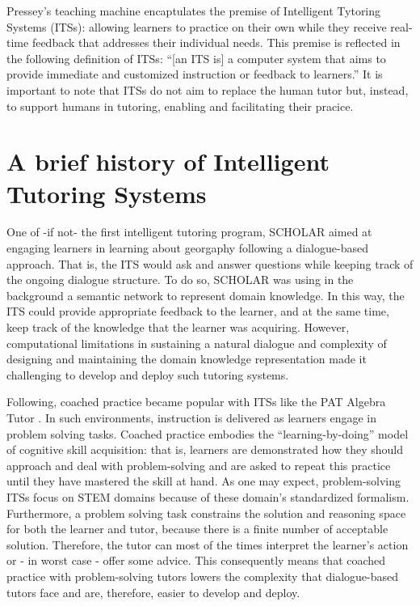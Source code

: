 \documentclass[
]{book}
\begin{document}
Pressey's teaching machine encaptulates the premise of Intelligent Tytoring Systems (ITSs): allowing learners to practice on their own while they receive real-time feedback that addresses their individual needs. This premise is reflected in the following definition of ITSs: ``{[}an ITS is{]} a computer system that aims to provide immediate and customized instruction or feedback to learners.'' \citep{psotka1988intelligent} It is important to note that ITSs do not aim to replace the human tutor but, instead, to support humans in tutoring, enabling and facilitating their pracice.

\section{A brief history of Intelligent Tutoring Systems}\label{a-brief-history-of-intelligent-tutoring-systems}

One of -if not- the first intelligent tutoring program, SCHOLAR \citep{carbonell1970mixed} aimed at engaging learners in learning about georgaphy following a dialogue-based approach. That is, the ITS would ask and answer questions while keeping track of the ongoing dialogue structure. To do so, SCHOLAR was using in the background a semantic network to represent domain knowledge. In this way, the ITS could provide appropriate feedback to the learner, and at the same time, keep track of the knowledge that the learner was acquiring. However, computational limitations in sustaining a natural dialogue and complexity of designing and maintaining the domain knowledge representation made it challenging to develop and deploy such tutoring systems.

Following, coached practice became popular with ITSs like the PAT Algebra Tutor \citep{anderson1995cognitive}. In such environments, instruction is delivered as learners engage in problem solving tasks. Coached practice embodies the ``learning-by-doing'' model of cognitive skill acquisition: that is, learners are demonstrated how they should approach and deal with problem-solving and are asked to repeat this practice until they have mastered the skill at hand. As one may expect, problem-solving ITSs focus on STEM domains because of these domain's standardized formalism. Furthermore, a problem solving task constrains the solution and reasoning space for both the learner and tutor, because there is a finite number of acceptable solution. Therefore, the tutor can most of the times interpret the learner's action or - in worst case - offer some advice. This consequently means that coached practice with problem-solving tutors lowers the complexity that dialogue-based tutors face and are, therefore, easier to develop and deploy.
\end{document}
